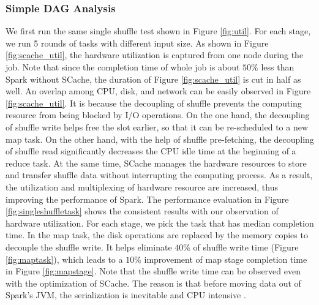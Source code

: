 \subsubsection{Simple DAG Analysis}\label{simpledag}
We first run the same single shuffle test shown in Figure \ref{fig:util}. 
For each stage, we run 5 rounds of tasks with different input size. 
As shown in Figure \ref{fig:scache_util}, the hardware utilization is captured from one node during the job. 
Note that since the completion time of whole job is about $50\%$ less than Spark without SCache, the duration of Figure \ref{fig:scache_util} is cut in half as well. 
An overlap among CPU, disk, and network can be easily observed in Figure \ref{fig:scache_util}. 
It is because the decoupling of shuffle prevents the computing resource from being blocked by I/O operations. 
On the one hand, the decoupling of shuffle write helps free the slot earlier, so that it can be re-scheduled to a new map task.
On the other hand, with the help of shuffle pre-fetching, the decoupling of shuffle read significantly decreases the CPU idle time at the beginning of a reduce task.
At the same time, SCache manages the hardware resources to store and transfer shuffle data without interrupting the computing process.
As a result, the utilization and multiplexing of hardware resource are increased, thus improving the performance of Spark. 
The performance evaluation in Figure \ref{fig:singleshuffletask} shows the consistent results with our observation of hardware utilization. 
For each stage, we pick the task that has median completion time. 
In the map task, the disk operations are replaced by the memory copies to decouple the shuffle write. 
It helps eliminate $40\%$ of shuffle write time (Figure \ref{fig:maptask}), which leads to a $10\%$ improvement of map stage completion time in Figure \ref{fig:mapstage}. 
Note that the shuffle write time can be observed even with the optimization of SCache. 
The reason is that before moving data out of Spark's JVM, the serialization is inevitable and CPU intensive \cite{makingsense}. 

